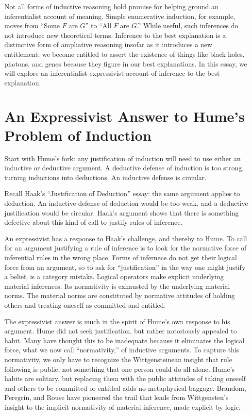\documentclass{article}                     %
\begin{document}
Not all forms of inductive reasoning hold promise for helping ground an inferentialist account of meaning.  Simple enumerative induction, for example, moves from ``Some $F$ are $G$'' to ``All $F$ are $G$.''  While useful, such inferences do not introduce new theoretical terms.  Inference to the best explanation is a distinctive form of ampliative reasoning insofar as it introduces a new entitlement: we become entitled to assert the existence of things like black holes, photons, and genes because they figure in our best explanations.  In this essay, we will explore an inferentialist expressivist account of inference to the best explanation.


\section{An Expressivist Answer to Hume's Problem of Induction}

Start with Hume's fork: any justification of induction will need to use either an inductive or deductive argument. A deductive defense of induction is too strong, turning inductions into deductions.  An inductive defense is circular.

Recall Haak's ``Justification of Deduction'' essay: the same argument applies to deduction.  An inductive defense of deduction would be too weak, and a deductive justification would be circular.  Haak's argument shows that there is something defective about this kind of call to justify rules of inference.

An expressivist has a response to Haak's challenge, and thereby to Hume.  To call for an argument justifying a rule of inference is to look for the normative force of inferential rules in the wrong place.  Forms of infernece do not get their logical force from an argument, so to ask for ``justification'' in the way one might justify a belief, is a category mistake.  Logical operators make explicit underlying material inferences.  Its normativity is exhausted by the underlying material norms.  The material norms are constituted by normative attitudes of holding others and treating oneself as committed and entitled.

The expressivist answer is much in the spirit of Hume's own response to his argument.  Hume did not seek justification, but rather notoriously appealed to habit.  Many have thought this to be inadequate because it eliminates the logical force, what we now call ``normativity,'' of inductive arguments. To capture this normativity, we only have to recognize the Wittgensteinean insight that rule following is public, not something that one person could do all alone. Hume's habits are solitary, but replacing them with the public attitudes of taking oneself and others to be committed or entitled adds no metaphysical baggage.  Brandom, Peregrin, and Rouse have pioneered the trail that leads from Wittgensten's insight to the implicit normativity of material inference, made explicit by logic.
\end{document}
